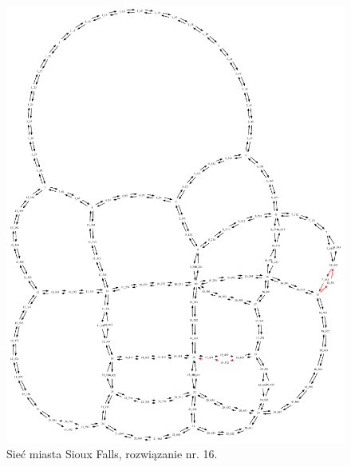 \documentclass[twoside,12pt]{report}
\begin{document}
\begin{figure}[ht]
\centering
\includegraphics[totalheight=0.580\textheight, angle=90]{img/sioux-out/16/network2}
\caption{Sieć miasta Sioux Falls, rozwiązanie nr. 16.}
\label{sioux16}
\end{figure}
\end{document}
